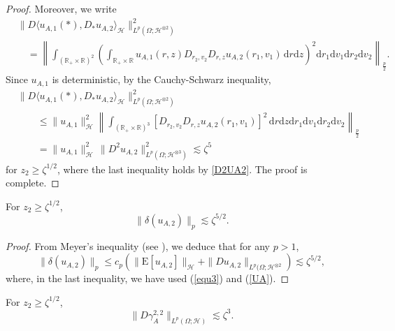 \documentclass[12pt,a4paper]{article}
\newcommand{\R}{{\mathbb{R}}}
\newcommand{\E}{\mathrm{E}}
\newcommand{\HH}{\mathcal{H}}
\renewcommand{\d}{\mathrm{d}}
\newcommand {\deltah}{{\zeta}}
\newcommand{\<}{\langle}
\renewcommand{\>}{\rangle}
\begin{document}
\begin{proof}
          Moreover, we write
          \begin{align*}
          &\| D \langle u_{A,1}(*), D_{*}u_{A,2}\rangle_{\HH} \|^2_{L^p(\Omega; \HH^{\otimes2})}\\
          &\quad=\left\|\int_{(\R_+\times\R)^2} \left(
          \int_{\R_+\times\R}u_{A,1}(r,z)D_{r_2, v_2}D_{r,z}u_{A,2}(r_1,v_1)\, \d r\d z
          \right)^2 \d r_1\d v_1\d r_2\d v_2
          \right\|_{\frac p2}.
          \end{align*}
          Since $u_{A,1}$ is deterministic, by the Cauchy-Schwarz inequality, 
          \begin{align*}
          &\| D \langle u_{A,1}(*), D_{*}u_{A,2}\rangle_{\HH} \|^2_{L^p(\Omega; \HH^{\otimes2})}\\
          &\qquad \leq  \|u_{A,1}\|_{\HH}^2 \left\|\int_{(\R_+\times\R)^3} 
          [D_{r_2, v_2}D_{r,z}u_{A,2}(r_1,v_1)]^2\, \d r\d z
           \d r_1\d v_1\d r_2\d v_2
          \right\|_{\frac p2}\\
          &\qquad=  \|u_{A,1}\|_{\HH}^2\,  \|D^2u_{A,2}\|^2_{L^p(\Omega; \HH^{\otimes3})} \lesssim \deltah^{5}
          \end{align*}
          for $z_2\geq \deltah^{1/2}$, where the last inequality holds by \eqref{D2UA2}.        
          The proof is complete.
\end{proof}

 \begin{lemma}
  For $z_2\geq \deltah^{1/2}$, 
  \begin{equation} \label{for21}
    \|\delta(u_{A,2})\|_p   \lesssim \deltah^{5/2}.
    \end{equation}
     \end{lemma}
     
\begin{proof}
From Meyer's inequality (see \cite[Proposition 1.5.8]{nualart2006}), we deduce that for any $p>1$,
\[
  \|\delta(u_{A,2})\|_p \le c_p \left( \|\E[u_{A,2}]\|_\HH+ \| Du_{A,2} \|_{L^p(\Omega; \HH^{\otimes2}} \right)
  \lesssim \deltah^{5/2},
\]
  where, in the last inequality, we have used (\ref{equ3}) and (\ref{UA}).
  \end{proof}

  
  \begin{lemma}\label{lem:gamma}
 For $z_2\geq \deltah^{1/2}$, 
 \begin{equation} \label{Dgamma}
 \|D\gamma_A^{2,2}\|_{L^p(\Omega;\mathcal{H})} \lesssim \deltah^{3}.
 \end{equation}
 \end{lemma}
 
\end{document}
